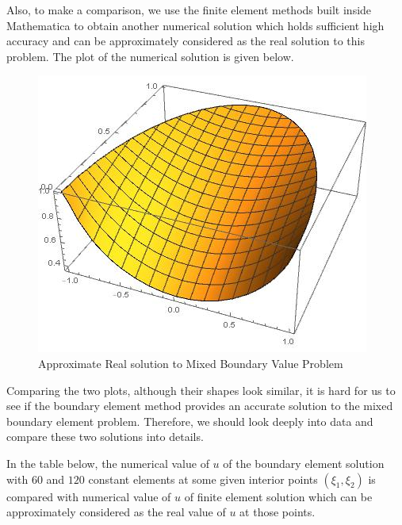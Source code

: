 \documentclass[a4paper,12pt]{article}
\begin{document}
Also, to make a comparison, we use the finite element methods built inside Mathematica to obtain another numerical solution which holds sufficient high accuracy and can be approximately considered as the real solution to this problem. The plot of the numerical solution is given below.

\begin{figure}[H]
\centering
\includegraphics[scale=0.55]{analytic2.jpg}
\caption{Approximate Real solution to Mixed Boundary Value Problem}
\end{figure}

\par Comparing the two plots, although their shapes look similar, it is hard for us to see if the boundary element method provides an accurate solution to the mixed boundary element problem. Therefore, we should look deeply into data and compare these two solutions into details. 

\par In the table below, the numerical value of $u$ of the boundary element solution with $60$ and $120$ constant elements at some given interior points $(\xi_1,\xi_2)$ is compared with numerical value of $u$ of finite element solution which can be approximately considered as the real value of $u$ at those points. 
\end{document}
